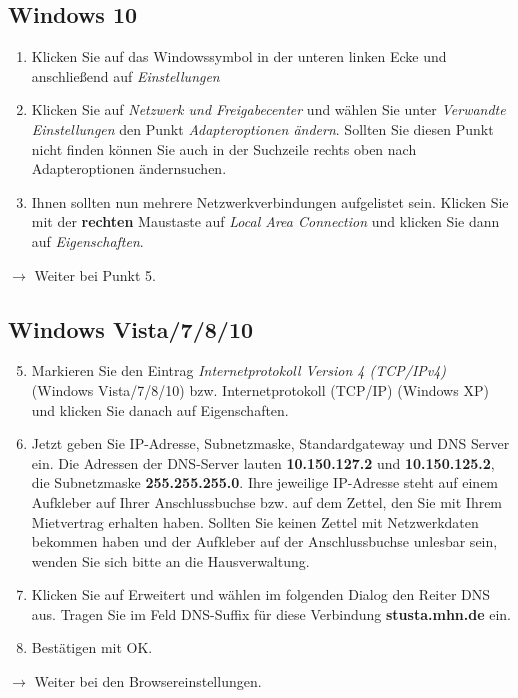 \documentclass[a4paper,12pt]{scrartcl}
\begin{document}
\subsection*{Windows 10}
\begin{enumerate}
	\item Klicken Sie auf das Windowssymbol in der unteren linken Ecke und anschließend auf \emph{Einstellungen}
	\item Klicken Sie auf \textit{Netzwerk und Freigabecenter} und wählen Sie unter \textit{Verwandte Einstellungen} den Punkt \textit{Adapteroptionen ändern}. Sollten Sie diesen Punkt nicht finden können Sie auch in der Suchzeile rechts oben nach \glqq Adapteroptionen ändern\grqq suchen.
    \item Ihnen sollten nun mehrere Netzwerkverbindungen aufgelistet sein. Klicken Sie mit der \textbf{rechten} Maustaste auf \textit{Local Area Connection} und klicken Sie dann auf \textit{Eigenschaften}.
\end{enumerate}
$\rightarrow$ Weiter bei Punkt 5.

\subsection*{Windows Vista/7/8/10}
\begin{enumerate}
    \setcounter{enumi}{4}
    \item Markieren Sie den Eintrag \textit{Internetprotokoll Version 4 (TCP/IPv4)} (Windows Vista/7/8/10) bzw. Internetprotokoll  (TCP/IP) (Windows XP) und klicken Sie danach auf Eigenschaften.
    \item Jetzt geben Sie IP-Adresse, Subnetzmaske, Standardgateway und DNS Server ein. Die Adressen der DNS-Server lauten \textbf{10.150.127.2} und \textbf{10.150.125.2}, die Subnetzmaske \textbf{255.255.255.0}. Ihre jeweilige IP-Adresse steht auf einem Aufkleber auf Ihrer Anschlussbuchse bzw. auf dem Zettel, den Sie mit Ihrem Mietvertrag erhalten haben. Sollten Sie keinen Zettel mit Netzwerkdaten bekommen haben und der Aufkleber auf der Anschlussbuchse unlesbar sein, wenden Sie sich bitte an die Hausverwaltung.
    \item Klicken Sie auf Erweitert und wählen im folgenden Dialog den Reiter DNS aus. Tragen Sie im Feld DNS-Suffix für diese Verbindung \textbf{stusta.mhn.de} ein.
    \item Bestätigen mit OK.
\end{enumerate}
$\rightarrow$ Weiter bei den Browsereinstellungen.
\end{document}
